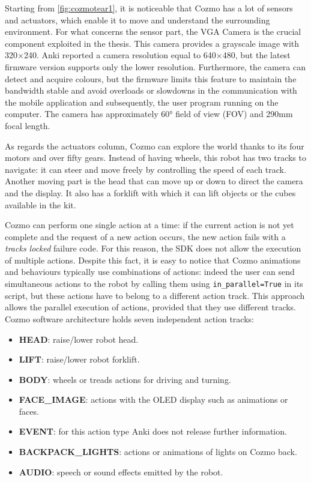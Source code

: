	Starting from \vref{fig:cozmotear1}, it is noticeable that Cozmo has a lot of sensors and actuators, which enable it to move and understand the surrounding environment. For what concerns the sensor part, the VGA Camera is the crucial component exploited in the thesis. This camera provides a grayscale image with 320$\times$240. Anki reported a camera resolution equal to 640$\times$480, but the latest firmware version supports only the lower resolution. Furthermore, the camera can detect and acquire colours, but the firmware limits this feature to maintain the bandwidth stable and avoid overloads or slowdowns in the communication with the mobile application and subsequently, the user program running on the computer. 
The camera has approximately 60° field of view (FOV) and 290mm focal length.

As regards the actuators column, Cozmo can explore the world thanks to its four motors and over fifty gears. Instead of having wheels, this robot has two tracks to navigate: it can steer and move freely by controlling the speed of each track.
Another moving part is the head that can move up or down to direct the camera and the display. It also has a forklift with which it can lift objects or the cubes available in the kit.

Cozmo can perform one single action at a time: if the current action is not yet complete and the request of a new action occurs, the new action fails with a \textit{tracks locked} failure code. For this reason, the SDK does not allow the execution of multiple actions. Despite this fact, it is easy to notice that Cozmo animations and behaviours typically use combinations of actions: indeed the user can send simultaneous actions to the robot by calling them using \texttt{in\_parallel=True} in its script, but these actions have to belong to a different action track. This approach allows the parallel execution of actions, provided that they use different tracks.
Cozmo software architecture holds seven independent action tracks:

\begin{itemize}
	\item \textbf{HEAD}: raise/lower robot head.
	\item \textbf{LIFT}: raise/lower robot forklift.
	\item \textbf{BODY}: wheels or treads actions for driving and turning.
	\item \textbf{FACE\_IMAGE}: actions with the OLED display such as animations or faces.
	\item \textbf{EVENT}: for this action type Anki does not release further information.
	\item \textbf{BACKPACK\_LIGHTS}: actions or animations of lights on Cozmo back.
	\item \textbf{AUDIO}: speech or sound effects emitted by the robot.
\end{itemize}

